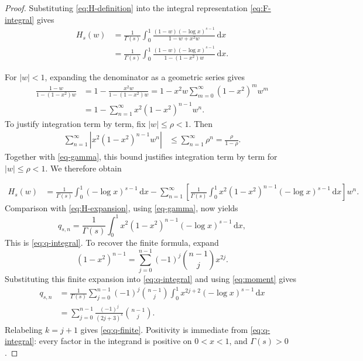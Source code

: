 \documentclass[11pt,reqno]{amsart}
\numberwithin{equation}{section}
\theoremstyle{definition}
\theoremstyle{remark}
\newcommand{\dd}{\,\mathrm{d}}
\begin{document}
\begin{proof}
Substituting \eqref{eq:H-definition} into the integral representation
\eqref{eq:F-integral} gives
\[
 \begin{aligned}
 H_s(w)
 &=
 \frac1{\Gamma(s)}
 \int_0^1
 \frac{(1-w)(-\log x)^{s-1}}
 {1-w+x^2w}\dd x\\
 &=
 \frac1{\Gamma(s)}
 \int_0^1
 \frac{(1-w)(-\log x)^{s-1}}
 {1-(1-x^2)w}\dd x.
 \end{aligned}
\]

For \(|w|<1\), expanding the denominator as a geometric series gives
\[
 \begin{aligned}
 \frac{1-w}{1-(1-x^2)w}
 &=
 1-\frac{x^2w}{1-(1-x^2)w}=
 1-x^2w
 \sum_{m=0}^{\infty}(1-x^2)^mw^m\\
 &=
 1-\sum_{n=1}^{\infty}
 x^2(1-x^2)^{n-1}w^n.
 \end{aligned}
\] 
To justify integration term by term, fix \(|w|\leq\rho<1\).  Then
\[
 \begin{aligned}
 \sum_{n=1}^{\infty}
 \left|
 x^2(1-x^2)^{n-1}w^n
 \right|
 &\leq
 \sum_{n=1}^{\infty}\rho^n=
 \frac{\rho}{1-\rho}.
 \end{aligned}
\]
Together with \eqref{eq-gamma}, this bound justifies integration term by
term for \(|w|\leq\rho<1\).  We therefore obtain

\[
 \begin{aligned}
 H_s(w)
 &=
 \frac1{\Gamma(s)}
 \int_0^1(-\log x)^{s-1}\dd x-
 \sum_{n=1}^{\infty}
 \left[
 \frac1{\Gamma(s)}
 \int_0^1
 x^2(1-x^2)^{n-1}
 (-\log x)^{s-1}\dd x
 \right]w^n.
 \end{aligned}
\]
Comparison with \eqref{eq:H-expansion}, using
\eqref{eq-gamma}, now yields
\[
 q_{s,n}
 =
 \frac1{\Gamma(s)}
 \int_0^1
 x^2(1-x^2)^{n-1}
 (-\log x)^{s-1}\dd x,
\]
This is \eqref{eq:q-integral}.  To recover the finite formula, expand
\[
 (1-x^2)^{n-1}
 =
 \sum_{j=0}^{n-1}
 (-1)^j\binom{n-1}{j}x^{2j}.
\]
Substituting this finite expansion into \eqref{eq:q-integral} and
using \eqref{eq:moment} gives
\[
 \begin{aligned}
 q_{s,n}
 &=
 \frac1{\Gamma(s)}
 \sum_{j=0}^{n-1}
 (-1)^j\binom{n-1}{j}
 \int_0^1
 x^{2j+2}(-\log x)^{s-1}\dd x\\
 &=
 \sum_{j=0}^{n-1}
 \frac{(-1)^j}{(2j+3)^s}
 \binom{n-1}{j}.
 \end{aligned}
\]
Relabeling \(k=j+1\) gives \eqref{eq:q-finite}.  Positivity is
immediate from \eqref{eq:q-integral}: every factor in the integrand is
positive on \(0<x<1\), and \(\Gamma(s)>0\).
\end{proof}
\end{document}
